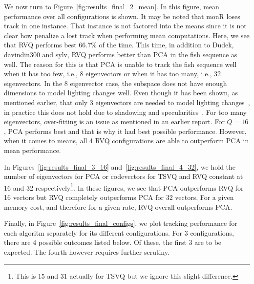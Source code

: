 We now turn to Figure~\ref{fig:results_final_2_mean}.  In this figure, mean performance over all configurations is shown.  It may be noted that monR loses track in one instance.  That instance is not factored into the means since it is not clear how penalize a lost track when performing mean computations.  Here, we see that RVQ performs best 66.7\% of the time.  This time, in addition to Dudek, davindin300 and sylv, RVQ performs better than PCA in the fish sequence as well.  The reason for this is that PCA is unable to track the fish sequence well when it has too few, i.e., 8 eigenvectors or when it has too many, i.e., 32 eigenvectors.  In the 8 eigenvector case, the subspace does not have enough dimensions to model lighting changes well.  Even though it has been shown, as mentioned earlier, that only 3 eigenvectors are needed to model lighting changes~\cite{1987_JNL_Faces_Sirovich}, in practice this does not hold due to shadowing and specularities~\cite{1997_JNL_EigenVsFisherFaces_Bel}.  For too many eigenvectors, over-fitting is an issue as mentioned in an earlier report.  For $Q=16$, PCA performs best and that is why it had best possible performance.  However, when it comes to means, all 4 RVQ configurations are able to outperform PCA in mean performance.

In Figures~\ref{fig:results_final_3_16} and~\ref{fig:results_final_4_32}, we hold the number of eigenvectors for PCA or codevectors for TSVQ and RVQ constant at 16 and 32 respectively\footnote{This is 15 and 31 actually for TSVQ but we ignore this slight difference.}.  In these figures, we see that PCA outperforms RVQ for 16 vectors but RVQ completely outperforms PCA for 32 vectors.  For a given memory cost, and therefore for a given rate, RVQ overall outperforms PCA.  

Finally, in Figure~\ref{fig:results_final_configs}, we plot tracking performance for each algoritm separately for its different configurations.  For 3 configurations, there are 4 possible outcomes listed below.  Of these, the first 3 are to be expected.  The fourth however requires further scrutiny.

